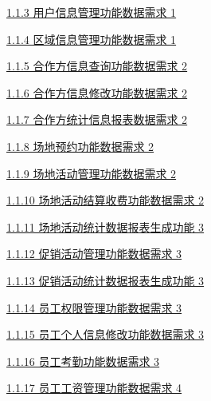 \documentclass[]{article}
\begin{document}
\protect\hyperlink{ux7528ux6237ux4fe1ux606fux7ba1ux7406ux529fux80fdux6570ux636eux9700ux6c42}{1.1.3
  用户信息管理功能数据需求 1}

\protect\hyperlink{ux533aux57dfux4fe1ux606fux7ba1ux7406ux529fux80fdux6570ux636eux9700ux6c42}{1.1.4
  区域信息管理功能数据需求 1}

\protect\hyperlink{ux5408ux4f5cux65b9ux4fe1ux606fux67e5ux8be2ux529fux80fdux6570ux636eux9700ux6c42}{1.1.5
  合作方信息查询功能数据需求 2}

\protect\hyperlink{ux5408ux4f5cux65b9ux4fe1ux606fux4feeux6539ux529fux80fdux6570ux636eux9700ux6c42}{1.1.6
  合作方信息修改功能数据需求 2}

\protect\hyperlink{ux5408ux4f5cux65b9ux7edfux8ba1ux4fe1ux606fux62a5ux8868ux6570ux636eux9700ux6c42}{1.1.7
  合作方统计信息报表数据需求 2}

\protect\hyperlink{ux573aux5730ux9884ux7ea6ux529fux80fdux6570ux636eux9700ux6c42}{1.1.8
  场地预约功能数据需求 2}

\protect\hyperlink{ux573aux5730ux6d3bux52a8ux7ba1ux7406ux529fux80fdux6570ux636eux9700ux6c42}{1.1.9
  场地活动管理功能数据需求 2}

\protect\hyperlink{ux573aux5730ux6d3bux52a8ux7ed3ux7b97ux6536ux8d39ux529fux80fdux6570ux636eux9700ux6c42}{1.1.10
  场地活动结算收费功能数据需求 2}

\protect\hyperlink{ux573aux5730ux6d3bux52a8ux7edfux8ba1ux6570ux636eux62a5ux8868ux751fux6210ux529fux80fd}{1.1.11
  场地活动统计数据报表生成功能 3}

\protect\hyperlink{ux4fc3ux9500ux6d3bux52a8ux7ba1ux7406ux529fux80fdux6570ux636eux9700ux6c42}{1.1.12
  促销活动管理功能数据需求 3}

\protect\hyperlink{ux4fc3ux9500ux6d3bux52a8ux7edfux8ba1ux6570ux636eux62a5ux8868ux751fux6210ux529fux80fd}{1.1.13
  促销活动统计数据报表生成功能 3}

\protect\hyperlink{ux5458ux5de5ux6743ux9650ux7ba1ux7406ux529fux80fdux6570ux636eux9700ux6c42}{1.1.14
  员工权限管理功能数据需求 3}

\protect\hyperlink{ux5458ux5de5ux4e2aux4ebaux4fe1ux606fux4feeux6539ux529fux80fdux6570ux636eux9700ux6c42}{1.1.15
  员工个人信息修改功能数据需求 3}

\protect\hyperlink{ux5458ux5de5ux8003ux52e4ux529fux80fdux6570ux636eux9700ux6c42}{1.1.16
  员工考勤功能数据需求 3}

\protect\hyperlink{ux5458ux5de5ux5de5ux8d44ux7ba1ux7406ux529fux80fdux6570ux636eux9700ux6c42}{1.1.17
  员工工资管理功能数据需求 4}
\end{document}
